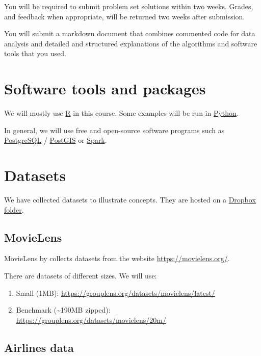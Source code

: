 \documentclass[]{book}
\providecommand{\tightlist}{%
  \setlength{\itemsep}{0pt}\setlength{\parskip}{0pt}}
\theoremstyle{definition}
\theoremstyle{definition}
\theoremstyle{definition}
\theoremstyle{remark}
\begin{document}
You will be required to submit problem set solutions within two weeks.
Grades, and feedback when appropriate, will be returned two weeks after
submission.

You will submit a markdown document that combines commented code for
data analysis and detailed and structured explanations of the algorithms
and software tools that you used.

\section{Software tools and packages}\label{software-tools-and-packages}

We will mostly use \href{https://www.r-project.org/}{R} in this course.
Some examples will be run in \href{https://www.python.org/}{Python}.

In general, we will use free and open-source software programs such as
\href{https://www.postgresql.org/}{PostgreSQL} /
\href{http://postgis.net/}{PostGIS} or
\href{https://spark.apache.org/}{Spark}.

\section{Datasets}\label{datasets}

We have collected datasets to illustrate concepts. They are hosted on a
\href{https://www.dropbox.com/sh/mt4a7goxsl44swm/AADJK54wOXlDZjABMxN0DJIHa?dl=0}{Dropbox
folder}.

\subsection{MovieLens}\label{movielens}

MovieLens by
\citet[\url{https://grouplens.org/datasets/movielens/}]{Harper2015}
collects datasets from the website \url{https://movielens.org/}.

There are datasets of different sizes. We will use:

\begin{enumerate}
\def\labelenumi{\arabic{enumi}.}
\tightlist
\item
  Small (1MB): \url{https://grouplens.org/datasets/movielens/latest/}
\item
  Benchmark (\textasciitilde{}190MB zipped):
  \url{https://grouplens.org/datasets/movielens/20m/}
\end{enumerate}

\subsection{Airlines data}\label{airlines-data}
\end{document}
